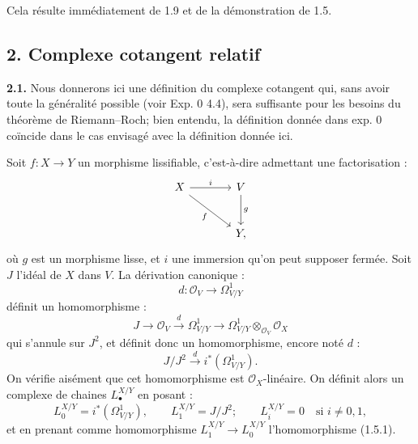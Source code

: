 Cela résulte immédiatement de 1.9 et de la démonstration de 1.5.

\subsection*{2. Complexe cotangent relatif}

\textbf{2.1.} Nous donnerons ici une définition du complexe cotangent qui, sans avoir toute la généralité possible (voir Exp. 0 4.4), sera suffisante pour les besoins du théorème de Riemann--Roch; bien entendu, la définition donnée dans exp. 0 coïncide dans le cas envisagé avec la définition donnée ici.

Soit $f:X\to Y$ un morphisme lissifiable, c'est-à-dire admettant une factorisation :
\[
\begin{tikzcd}[column sep=large,row sep=large]
X \arrow[r,"i"] \arrow[dr,"f"'] & V \arrow[d,"g"]\\
& Y,
\end{tikzcd}
\]
où $g$ est un morphisme lisse, et $i$ une immersion qu'on peut supposer fermée. Soit $J$ l'idéal de $X$ dans $V$. La dérivation canonique :
\[
d:\mathcal O_V\longrightarrow\Omega^1_{V/Y}
\]
définit un homomorphisme :
\[
J\longrightarrow\mathcal O_V\xrightarrow{d}\Omega^1_{V/Y}\longrightarrow
\Omega^1_{V/Y}\otimes_{\mathcal O_V}\mathcal O_X
\]
qui s'annule sur $J^2$, et définit donc un homomorphisme, encore noté $d$ :
\begin{equation}\tag{2.1.1}
J/J^2\xrightarrow{d} i^*(\Omega^1_{V/Y}).
\end{equation}
On vérifie aisément que cet homomorphisme est $\mathcal O_X$-linéaire. On définit alors un complexe de chaines $L^{X/Y}_\bullet$ en posant :
\[
L^{X/Y}_0=i^*(\Omega^1_{V/Y}),\qquad
L^{X/Y}_1=J/J^2;
\qquad
L^{X/Y}_i=0\quad\text{si }i\neq0,1,
\]
et en prenant comme homomorphisme $L^{X/Y}_1\to L^{X/Y}_0$ l'homomorphisme (1.5.1).

